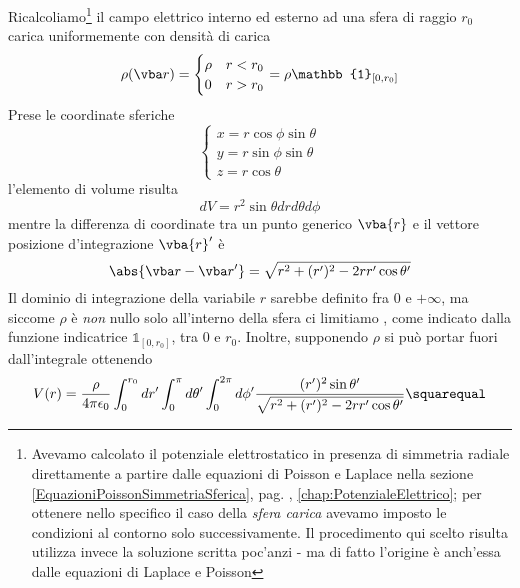 \begin{examplewt}
	Ricalcoliamo\footnote{Avevamo calcolato il potenziale elettrostatico in presenza di simmetria radiale direttamente a partire dalle equazioni di Poisson e Laplace nella sezione \ref{EquazioniPoissonSimmetriaSferica}, pag. \pageref{EquazioniPoissonSimmetriaSferica}, \autoref{chap:PotenzialeElettrico}; per ottenere nello specifico il caso della \textit{sfera carica}  avevamo imposto le condizioni al contorno solo successivamente. Il procedimento qui scelto risulta utilizza invece la soluzione scritta poc'anzi - ma di fatto l'origine è anch'essa dalle equazioni di Laplace e Poisson} il campo elettrico interno ed esterno ad una sfera di raggio $r_0$ carica uniformemente con densità di carica
	\begin{equation*}
		\rho(\vba r)=
		\begin{cases}
			\rho & r<r_0\\
			0 & r>r_0
		\end{cases}=\rho\mathbb{1}_{[0,r_0]}
	\end{equation*}
	Prese le coordinate sferiche
	\begin{equation*}
		\begin{cases}
			x=r\cos\phi\sin\theta\\
			y=r\sin\phi\sin\theta\\
			z=r\cos\theta
		\end{cases}
	\end{equation*}
	l'elemento di volume risulta
	\begin{equation*}
		dV=r^2\sin\theta drd\theta d\phi
	\end{equation*}
	mentre la differenza di coordinate tra un punto generico $\vba{r}$ e il vettore posizione d'integrazione  $\vba{r}'$ è
	\begin{equation*}
		\abs{\vba r-\vba r'}=\sqrt{r^2+(r')^2-2rr'\cos\theta '}
	\end{equation*}
	Il dominio di integrazione della variabile $r$ sarebbe definito fra $0$ e $+\infty$, ma siccome $\rho$ è \textit{non} nullo solo all'interno della sfera ci limitiamo , come indicato dalla funzione indicatrice $\mathbb{1}_{[0,r_0]}$, tra $0$ e $r_0$. Inoltre, supponendo $\rho$ si può portar fuori dall'integrale ottenendo
	\begin{equation*}
		V(r)=\frac{\rho}{4\pi\epsilon_0}\int^{r_0}_0dr' \int^\pi_0 d\theta' \int^{2\pi}_0 d\phi' \frac{(r')^2 \sin\theta '}{\sqrt{r^2+(r')^2 -2rr'\cos\theta '}}\squarequal	
	\end{equation*}

\end{examplewt}
